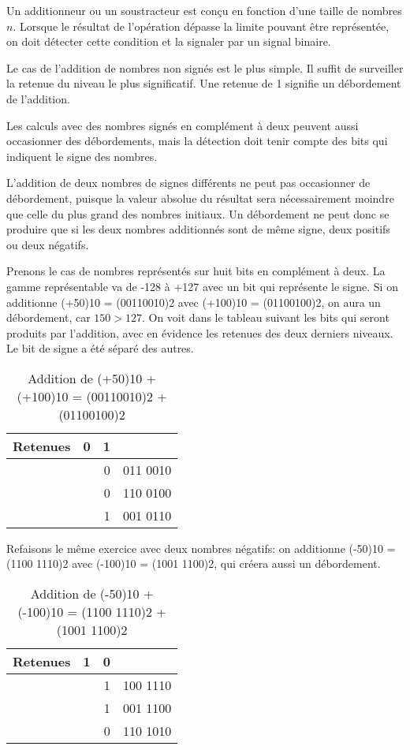 \documentclass[11pt]{article}
\begin{document}
Un additionneur ou un soustracteur est conçu en fonction d'une
taille de nombres \(n\). Lorsque le résultat de l'opération dépasse la
limite pouvant être représentée, on doit détecter cette condition et
la signaler par un signal binaire.

Le cas de l'addition de nombres non signés est le plus simple. Il
suffit de surveiller la retenue du niveau le plus significatif. Une
retenue de 1 signifie un débordement de l'addition.

Les calculs avec des nombres signés en complément à deux peuvent aussi
occasionner des débordements, mais la détection doit tenir compte des
bits qui indiquent le signe des nombres.

L'addition de deux nombres de signes différents ne peut pas
occasionner de débordement, puisque la valeur absolue du résultat sera
nécessairement moindre que celle du plus grand des nombres
initiaux. Un débordement ne peut donc se produire que si les deux
nombres additionnés sont de même signe, deux positifs ou deux
négatifs.

Prenons le cas de nombres représentés sur huit bits en complément à
deux. La gamme représentable va de -128 à +127 avec un bit qui
représente le signe. Si on additionne (+50)10 = (00110010)2 avec
(+100)10 = (01100100)2, on aura un débordement, car \(150 > 127\). On
voit dans le tableau suivant les bits qui seront produits par
l'addition, avec en évidence les retenues des deux derniers
niveaux. Le bit de signe a été séparé des autres.

\begin{table}[htbp]
\caption{\label{tab:org067b5b9}Addition de (+50)10 + (+100)10 = (00110010)2 + (01100100)2}
\centering
\begin{tabular}{lrrl}
Retenues & 0 & 1 & \\[0pt]
\hline
 &  & 0 & 011 0010\\[0pt]
 &  & 0 & 110 0100\\[0pt]
\hline
 &  & 1 & 001 0110\\[0pt]
\end{tabular}
\end{table}

Refaisons le même exercice avec deux nombres négatifs: on additionne
(-50)10 = (1100 1110)2 avec (-100)10 = (1001 1100)2, qui créera aussi un
débordement.

\begin{table}[htbp]
\caption{\label{tab:org2639c2d}Addition de (-50)10 + (-100)10 = (1100 1110)2 + (1001 1100)2}
\centering
\begin{tabular}{lrrl}
Retenues & 1 & 0 & \\[0pt]
\hline
 &  & 1 & 100 1110\\[0pt]
 &  & 1 & 001 1100\\[0pt]
\hline
 &  & 0 & 110 1010\\[0pt]
\end{tabular}
\end{table}
\end{document}
